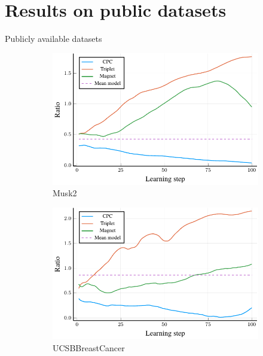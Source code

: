 \documentclass[10pt]{beamer}
\begin{document}
\section{Results on public datasets}

\begin{frame}{Publicly available datasets}
  \begin{figure}
  \centering
  \begin{subfigure}[t]{0.38\textwidth}
    \centering
    \includegraphics[width=\textwidth]{images/Musk2_ratio/Musk2_ratio.pdf}
    \caption{Musk2}
  \end{subfigure}
  \begin{subfigure}[t]{0.38\textwidth}
    \centering
    \includegraphics[width=\textwidth]{images/UCSBBreastCancer_ratio/UCSBBreastCancer_ratio.pdf}
    \caption{UCSBBreastCancer}
  \end{subfigure}
  \begin{subfigure}[t]{0.38\textwidth}

\end{subfigure}
\end{figure}
\end{frame}
\end{document}
